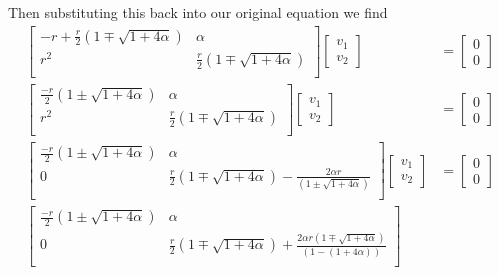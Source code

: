 \documentclass{article}
\begin{document}
Then substituting this back into our original equation we find
\begin{align*}
\begin{bmatrix}
-r + \frac{r}{2}\left( 1 \mp \sqrt{1 + 4\alpha} \right)	&	\alpha		\\
r^{2}														&	\frac{r}{2}\left( 1 \mp \sqrt{1 + 4\alpha} \right)	\\
\end{bmatrix}
\begin{bmatrix}
v_{1}\\
v_{2}
\end{bmatrix}
&=
\begin{bmatrix}
0\\
0
\end{bmatrix}
\\
\begin{bmatrix}
\frac{-r}{2}\left( 1 \pm \sqrt{1 + 4\alpha} \right)	&	\alpha		\\
r^{2}												&	\frac{r}{2}\left( 1 \mp \sqrt{1 + 4\alpha} \right)	\\
\end{bmatrix}
\begin{bmatrix}
v_{1}\\
v_{2}
\end{bmatrix}
&=
\begin{bmatrix}
0\\
0
\end{bmatrix}
\\
\begin{bmatrix}
\frac{-r}{2}\left( 1 \pm \sqrt{1 + 4\alpha} \right)	&	\alpha		\\
0												&	\frac{r}{2}\left( 1 \mp \sqrt{1 + 4\alpha} \right) - \frac{2\alpha r}{\left( 1 \pm \sqrt{1 + 4\alpha} \right)}	\\
\end{bmatrix}
\begin{bmatrix}
v_{1}\\
v_{2}
\end{bmatrix}
&=
\begin{bmatrix}
0\\
0
\end{bmatrix}
\\
\begin{bmatrix}
\frac{-r}{2}\left( 1 \pm \sqrt{1 + 4\alpha} \right)	&	\alpha		\\
0	&	\frac{r}{2}\left( 1 \mp \sqrt{1 + 4\alpha} \right) + \frac{2\alpha r \left( 1 \mp \sqrt{1 + 4\alpha} \right) }{\left( 1 - (1 + 4\alpha) \right)}	\\

\end{bmatrix}
\end{align*}
\end{document}
